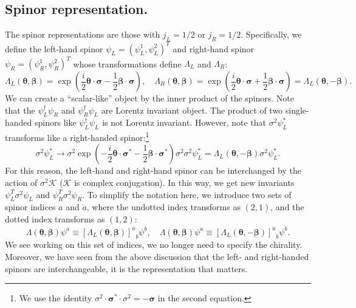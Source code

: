 \documentclass[aps,prb,superscriptaddress,nofootinbib]{revtex4}
\begin{document}
\subsection{Spinor representation.}
The spinor representations are those with $j_L=1/2$ or $j_R=1/2$. 
Specifically, we define the left-hand spinor $\psi_L = (\psi_L^1, \psi_L^2)^T$ and right-hand spinor $\psi_R = (\psi_R^1, \psi_R^2)^T$ whose transformations define $\Lambda_L$ and $\Lambda_R$:
\begin{equation}\label{eq:qft-left-right-spinor-rep}
	\Lambda_L(\bm\theta,\bm\beta) = \exp\left(\frac{i}{2}\bm\theta\cdot\bm\sigma-\frac{1}{2}\bm\beta\cdot\bm\sigma \right), \quad
	\Lambda_R(\bm\theta,\bm\beta) = \exp\left(\frac{i}{2}\bm\theta\cdot\bm\sigma+\frac{1}{2}\bm\beta\cdot\bm\sigma \right) = \Lambda_L(\bm \theta, -\bm \beta).
\end{equation}
We can create a ``scalar-like'' object by the inner product of the spinors.
Note that the $\psi_L^\dagger \psi_R$ and $\psi_R^\dagger \psi_L$ are Lorentz invariant object.
The product of two single-handed spinors like $\psi_L^\dagger \psi_L$ is not Lorentz invariant.
However, note that $\sigma^2 \psi_L^*$ transforms like a right-handed spinor:\footnote{We use the identity $\sigma^2 \cdot \bm\sigma^* \cdot\sigma^2 = -\bm\sigma$ in the second equation.}
\begin{equation}
	\sigma^2 \psi_L^*
	\rightarrow \sigma^2 \exp\left(-\frac{i}{2}\bm\theta\cdot\bm\sigma^*-\frac{1}{2}\bm\beta\cdot\bm\sigma^* \right) \sigma^2 \sigma^2 \psi_L^* 
	= \Lambda_L(\bm \theta, -\bm\beta) \sigma^2 \psi_L^*.
\end{equation}
For this reason, the left-hand and right-hand spinor can be interchanged by the action of $\sigma^2 \mathcal K$ ($\mathcal K$ is complex conjugation).
In this way, we get new invariants $\psi_L^T \sigma^2 \psi_L$ and $\psi_R^T \sigma^2 \psi_R$.
To simplify the notation here, we introduce two sets of spinor indices $a$ and $\dot a$, where the undotted index transforms as $(2,1)$, and the dotted index transforms as $(1,2)$:
\begin{equation}
	\Lambda(\bm\theta,\bm\beta) \psi^a \equiv {[\Lambda_L(\bm\theta,\bm\beta)]^a}_b \psi^b, \quad
	\Lambda(\bm\theta,\bm\beta) \psi^{\dot a} \equiv {[\Lambda_L(\bm\theta,-\bm\beta)]^{\dot a}}_{\dot b} \psi^{\dot b}.
\end{equation}
We see working on this set of indices, we no longer need to specify the chirality.
Moreover, we have seen from the above discussion that the left- and right-handed spinors are interchangeable, it is the representation that matters.
\end{document}
